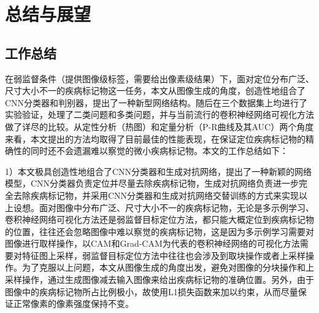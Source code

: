 \chapter{总结与展望}
\section{工作总结}

在弱监督条件（提供图像级标签，需要给出像素级结果）下，面对定位分布广泛、尺寸大小不一的疾病标记物这一任务，本文从图像生成的角度，创造性地组合了CNN分类器和判别器，提出了一种新型网络结构。随后在三个数据集上均进行了实验验证，处理了二类问题和多类问题，并与当前流行的卷积神经网络可视化方法做了详尽的比较。从定性分析（热图）和定量分析（P-R曲线及其AUC）两个角度来看，本文提出的方法均取得了目前最佳的性能表现，在保证定位疾病标记物的精确性的同时还不会遗漏难以察觉的微小疾病标记物。本文的工作总结如下：

1）本文极具创造性地组合了CNN分类器和生成对抗网络，提出了一种新颖的网络模型，CNN分类器负责定位并尽量去除疾病标记物，生成对抗网络负责进一步完全去除疾病标记物，并采用CNN分类器和生成对抗网络交替训练的方式来实现以上设想。面对图像中分布广泛、尺寸大小不一的疾病标记物，无论是多示例学习、卷积神经网络可视化方法还是弱监督目标定位方法，都只能大概定位到疾病标记物的位置，往往还会忽略图像中难以察觉的疾病标记物，这是因为多示例学习需要对图像进行取样操作，以CAM和Grad-CAM为代表的卷积神经网络的可视化方法需要对特征图上采样，弱监督目标定位方法中往往也会涉及到取块操作或者上采样操作。为了克服以上问题，本文从图像生成的角度出发，避免对图像的分块操作和上采样操作，通过生成图像减去输入图像来给出疾病标记物的准确位置。另外，由于图像中的疾病标记物所占比例极小，故使用L1损失函数来加以约束，从而尽量保证正常像素的像素强度保持不变。

